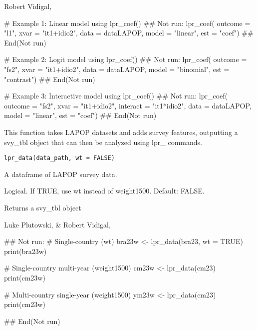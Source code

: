 \documentclass[a4paper]{book}
\begin{document}
%
\begin{Author}
Robert Vidigal, 
\end{Author}
%
\begin{Examples}
\begin{ExampleCode}
# Example 1: Linear model using lpr_coef()
## Not run: 
lpr_coef(
 outcome = "l1",
 xvar = "it1+idio2",
 data = dataLAPOP,
 model = "linear",
 est = "coef")
## End(Not run)

# Example 2: Logit model using lpr_coef()
## Not run: 
lpr_coef(
 outcome = "fs2",
 xvar = "it1+idio2",
 data = dataLAPOP,
 model = "binomial",
 est = "contrast")
## End(Not run)

# Example 3: Interactive model using lpr_coef()
## Not run: 
lpr_coef(
 outcome = "fs2",
 xvar = "it1+idio2",
 interact = "it1*idio2",
 data = dataLAPOP,
 model = "linear",
 est = "coef")
## End(Not run)
\end{ExampleCode}
\end{Examples}
%
\begin{Description}
This function takes LAPOP datasets and adds survey features, outputting a
svy\_tbl object that can then be analyzed using lpr\_ commands.
\end{Description}
%
\begin{Usage}
\begin{verbatim}
lpr_data(data_path, wt = FALSE)
\end{verbatim}
\end{Usage}
%
\begin{Arguments}
\begin{ldescription}
\item[\code{data\_path}] A dataframe of LAPOP survey data.

\item[\code{wt}] Logical.  If TRUE, use wt instead of weight1500.  Default: FALSE.
\end{ldescription}
\end{Arguments}
%
\begin{Value}
Returns a svy\_tbl object
\end{Value}
%
\begin{Author}
Luke Plutowski,  \& Robert Vidigal, 
\end{Author}
%
\begin{Examples}
\begin{ExampleCode}
## Not run: 
# Single-country (wt)
bra23w <- lpr_data(bra23, wt = TRUE)
print(bra23w)

# Single-country multi-year (weight1500)
cm23w <- lpr_data(cm23)
print(cm23w)

# Multi-country single-year (weight1500)
ym23w <- lpr_data(cm23)
print(cm23w)

## End(Not run)
\end{ExampleCode}
\end{Examples}
\end{document}
